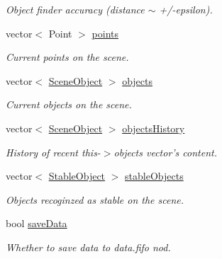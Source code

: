 \begin{DoxyCompactItemize}
\begin{DoxyCompactList}\small\item\em \-Object finder accuracy (distance $\sim$ +/-\/epsilon). \end{DoxyCompactList}\item 
\hypertarget{classDiodeFinder_ae8e3f7f936cacf2c6a3b144358012953}{vector$<$ \-Point $>$ \hyperlink{classDiodeFinder_ae8e3f7f936cacf2c6a3b144358012953}{points}}\label{classDiodeFinder_ae8e3f7f936cacf2c6a3b144358012953}

\begin{DoxyCompactList}\small\item\em \-Current points on the scene. \end{DoxyCompactList}\item 
\hypertarget{classDiodeFinder_a12e673d1cf9916ba26ec52c36a053079}{vector$<$ \hyperlink{classSceneObject}{\-Scene\-Object} $>$ \hyperlink{classDiodeFinder_a12e673d1cf9916ba26ec52c36a053079}{objects}}\label{classDiodeFinder_a12e673d1cf9916ba26ec52c36a053079}

\begin{DoxyCompactList}\small\item\em \-Current objects on the scene. \end{DoxyCompactList}\item 
\hypertarget{classDiodeFinder_a610957a6d33e716f593de491416dbf18}{vector$<$ \hyperlink{classSceneObject}{\-Scene\-Object} $>$ \hyperlink{classDiodeFinder_a610957a6d33e716f593de491416dbf18}{objects\-History}}\label{classDiodeFinder_a610957a6d33e716f593de491416dbf18}

\begin{DoxyCompactList}\small\item\em \-History of recent this-\/$>$objects vector's content. \end{DoxyCompactList}\item 
\hypertarget{classDiodeFinder_ad2af56469b06cf8efdc27069e3407226}{vector$<$ \hyperlink{classStableObject}{\-Stable\-Object} $>$ \hyperlink{classDiodeFinder_ad2af56469b06cf8efdc27069e3407226}{stable\-Objects}}\label{classDiodeFinder_ad2af56469b06cf8efdc27069e3407226}

\begin{DoxyCompactList}\small\item\em \-Objects recoginzed as stable on the scene. \end{DoxyCompactList}\item 
\hypertarget{classDiodeFinder_a882815fe3c490b495772d6afe81bf252}{bool \hyperlink{classDiodeFinder_a882815fe3c490b495772d6afe81bf252}{save\-Data}}\label{classDiodeFinder_a882815fe3c490b495772d6afe81bf252}

\begin{DoxyCompactList}\small\item\em \-Whether to save data to data.\-fifo nod. \end{DoxyCompactList}\end{DoxyCompactItemize}
